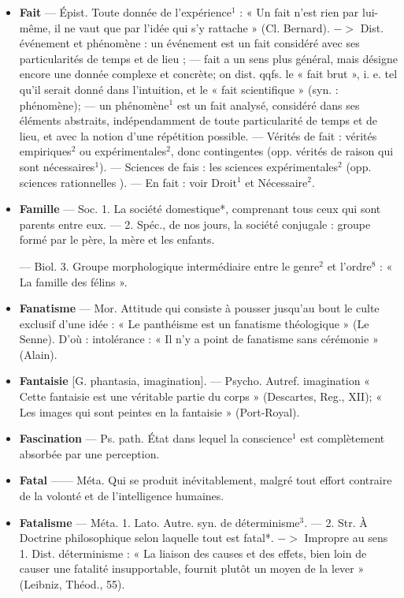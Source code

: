 \begin{itemize}[leftmargin=1cm, label=, itemsep=1pt]
\item {\bf Fait} — Épist. Toute donnée de l’expérience$^1$ : « Un fait n'est rien par
lui-même, il ne vaut que par l’idée
qui s’y rattache » (Cl. Bernard).
$->$ Dist. événement et phénomène : un événement est un fait considéré avec ses particularités de
temps et de lieu ; — fait a un sens
plus général, mais désigne encore
une donnée complexe et concrète;
on dist. qqfs. le « fait brut », i. e. tel
qu'il serait donné dans l'intuition,
et le « fait scientifique » (syn. : phénomène); — un phénomène$^1$ est un
fait analysé, considéré dans ses
éléments abstraits, indépendamment de toute particularité de temps
et de lieu, et avec la notion d’une
répétition possible. — Vérités de
fait : vérités empiriques$^2$ ou expérimentales$^2$, donc contingentes (opp.
vérités de raison qui sont nécessaires$^1$). — Sciences de fais :
les sciences expérimentales$^2$ (opp.
sciences rationnelles ). — En fait :
voir Droit$^1$ et Nécessaire$^2$.

\item {\bf Famille} — Soc. 1. La société domestique*, comprenant tous ceux qui
sont parents entre eux. — 2. Spéc.,
de nos jours, la société conjugale :
groupe formé par le père, la mère
et les enfants.

— Biol. 3. Groupe morphologique intermédiaire entre le genre$^2$
et l’ordre$^8$ : « La famille des
félins ».

\item {\bf Fanatisme} — Mor. Attitude qui consiste à pousser jusqu’au bout le
culte exclusif d’une idée : « Le panthéisme est un fanatisme théologique » (Le Senne). D'où : intolérance :
« Il n’y a point de fanatisme
sans cérémonie » (Alain).

\item {\bf Fantaisie} [G. phantasia, imagination].
— Psycho. Autref. imagination
« Cette fantaisie est une véritable
partie du corps » (Descartes, Reg.,
XII); « Les images qui sont peintes
en la fantaisie » (Port-Royal).

\item {\bf Fascination} — Ps. path. État dans
lequel la conscience$^1$ est complètement absorbée par une perception.

\item {\bf Fatal} —— Méta. Qui se produit inévitablement, malgré tout effort contraire de la volonté et de l’intelligence humaines.

\item {\bf Fatalisme} — Méta. 1. Lato. Autre.
syn. de déterminisme$^3$. — 2. Str.
À Doctrine philosophique selon laquelle tout est fatal*. $->$ Impropre
au sens 1. Dist. déterminisme : « La
liaison des causes et des effets, bien
loin de causer une fatalité insupportable, fournit plutôt un moyen de
la lever » (Leibniz, Théod., 55).


\end{itemize}
